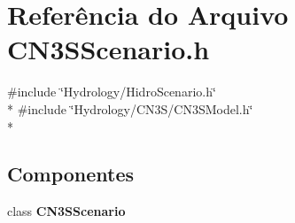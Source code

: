 \section{Referência do Arquivo C\+N3\+S\+Scenario.\+h}
\label{_c_n3_s_scenario_8h}
{\ttfamily \#include \char`\"{}Hydrology/\+Hidro\+Scenario.\+h\char`\"{}}\\*
{\ttfamily \#include \char`\"{}Hydrology/\+C\+N3\+S/\+C\+N3\+S\+Model.\+h\char`\"{}}\\*
\subsection*{Componentes}
\begin{DoxyCompactItemize}
\item 
class {\bf C\+N3\+S\+Scenario}
\end{DoxyCompactItemize}

